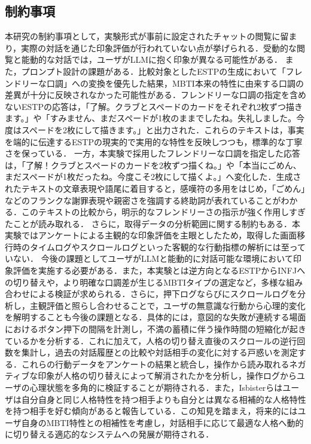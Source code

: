\documentclass[10pt,twocolumn]{jsarticle}
\begin{document}
\subsection{制約事項}
本研究の制約事項として，実験形式が事前に設定されたチャットの閲覧に留まり，実際の対話を通じた印象評価が行われていない点が挙げられる．受動的な閲覧と能動的な対話では，ユーザがLLMに抱く印象が異なる可能性がある．
また，プロンプト設計の課題がある．比較対象としたESTPの生成において「フレンドリーな口調」への変換を優先した結果，MBTI本来の特性に由来する口調の差異が十分に反映されなかった可能性がある．フレンドリーな口調の指定を含めないESTPの応答は，「了解。クラブとスペードのカードをそれぞれ2枚ずつ描きます。」や「すみません、まだスペードが1枚のままでしたね。失礼しました。今度はスペードを2枚にして描きます。」と出力された．これらのテキストは，事実を端的に伝達するESTPの現実的で実用的な特性を反映しつつも，標準的な丁寧さを保っている．
一方，本実験で採用したフレンドリーな口調を指定した応答は，「了解！クラブとスペードのカードを2枚ずつ描くね。」や「本当にごめん、まだスペードが1枚だったね。今度こそ2枚にして描くよ。」へ変化した．生成されたテキストの文章表現や語尾に着目すると，感嘆符の多用をはじめ，「ごめん」などのフランクな謝罪表現や親密さを強調する終助詞が表れていることがわかる．このテキストの比較から，明示的なフレンドリーさの指示が強く作用しすぎたことが読み取れる．
さらに，取得データの分析範囲に関する制約もある．本実験ではアンケートによる主観的な印象評価を主眼としたため，取得した画面移行時のタイムログやスクロールログといった客観的な行動指標の解析には至っていない．
今後の課題としてユーザがLLMと能動的に対話可能な環境において印象評価を実施する必要がある．また，本実験とは逆方向となるESTPからINFJへの切り替えや，より明確な口調差が生じるMBTIタイプの選定など，多様な組み合わせによる検証が求められる．さらに，押下ログならびにスクロールログを分析し，主観評価と照らし合わせることで，ユーザの無意識な行動から心理的変化を解明することも今後の課題となる．具体的には，意図的な失敗が連続する場面におけるボタン押下の間隔を計測し，不満の蓄積に伴う操作時間の短縮化が起きているかを分析する．これに加えて，人格の切り替え直後のスクロールの逆行回数を集計し，過去の対話履歴との比較や対話相手の変化に対する戸惑いを測定する．これらの行動データをアンケートの結果と統合し，操作から読み取れるネガティブな印象が人格の切り替えによって解消されたかを分析し，操作ログからユーザの心理状態を多角的に検証することが期待される．また，Isbisterら\cite{Isbister2000}はユーザは自分自身と同じ人格特性を持つ相手よりも自分とは異なる相補的な人格特性を持つ相手を好む傾向があると報告している．この知見を踏まえ，将来的にはユーザ自身のMBTI特性との相補性を考慮し，対話相手に応じて最適な人格へ動的に切り替える適応的なシステムへの発展が期待される．
\end{document}
